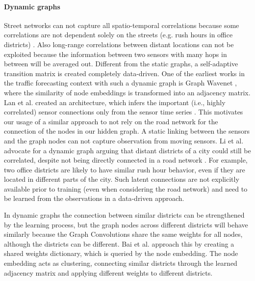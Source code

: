 \paragraph*{\textbf{Dynamic graphs}}
\label{subsec:dynamic}
Street networks can not capture all spatio-temporal correlations because some correlations are not dependent solely on the streets (e.g. rush hours in office districts) \cite{Li2021, Shao22}.
Also long-range correlations between distant locations can not be exploited because the information between two sensors with many hops in between will be averaged out.
Different from the static graphs, a self-adaptive transition matrix is created completely data-driven. 
One of the earliest works in the traffic forecasting context with such a dynamic graph is Graph Wavenet \cite{Wu2019}, where the similarity of node embeddings is transformed into an adjacency matrix.
Lan et al. created an architecture, which infers the important (i.e., highly correlated) sensor connections only from the sensor time series \cite{Lan22}.
This motivates our usage of a similar approach to not rely on the road network for the connection of the nodes in our hidden graph. 
A static linking between the sensors and the graph nodes can not capture observation from moving sensors. 
Li et al. advocate for a dynamic graph arguing that distant districts of a city could still be correlated, despite not being directly connected in a road network \cite{Li2021}. 
For example, two office districts are likely to have similar rush hour behavior, even if they are located in different parts of the city.
Such latent connections are not explicitly available prior to training (even when considering the road network) and need to be learned from the observations in a data-driven approach.

In dynamic graphs the connection between similar districts can be strengthened by the learning process, but the graph nodes across different districts will behave similarly because the Graph Convolutions share the same weights for all nodes, although the districts can be different.
Bai et al. approach this by creating a shared weights dictionary, which is queried by the node embedding. \cite{Bai20}
The node embedding acts as clustering, connecting similar districts through the learned adjacency matrix and applying different weights to different districts. 

